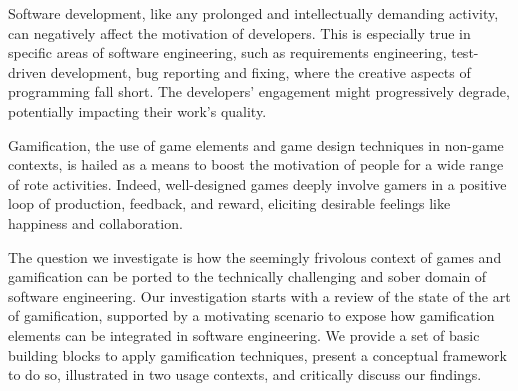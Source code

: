 


Software development, like any prolonged and intellectually demanding activity, can negatively affect the motivation of developers.
This is especially true in specific areas of software engineering, such as requirements engineering, test-driven development, bug reporting and fixing, where the creative aspects of programming fall short.
The developers' engagement might progressively degrade, potentially impacting their work's quality.

Gamification, the use of game elements and game design techniques in non-game contexts, is hailed as a means to boost the motivation of people for a wide range of rote activities.
Indeed, well-designed games deeply involve gamers in a positive loop of production, feedback, and reward, eliciting desirable feelings like happiness and collaboration.

The question we investigate is how the seemingly frivolous context of games and gamification can be ported to the technically challenging and sober domain of software engineering.
Our investigation starts with a review of the state of the art of gamification, supported by a motivating scenario to expose how gamification elements can be integrated in software engineering.
We provide a set of basic building blocks to apply gamification techniques, present a conceptual framework to do so, illustrated in two usage contexts, and critically discuss our findings.

\structure

